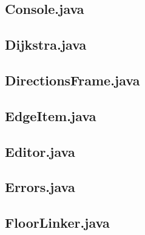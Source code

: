 \documentclass[12pt,letterpaper,titlepage]{article}   %
\begin{document}
\singlespacing
\begin{spacing}{0.7}
\tiny


\subsection{Console.java}
\begin{lgrind}

\end{lgrind}

\subsection{Dijkstra.java}
\begin{lgrind}

\end{lgrind}

\subsection{DirectionsFrame.java}
\begin{lgrind}

\end{lgrind}

\subsection{EdgeItem.java}
\begin{lgrind}

\end{lgrind}

\subsection{Editor.java}
\begin{lgrind}

\end{lgrind}

\subsection{Errors.java}
\begin{lgrind}

\end{lgrind}

\subsection{FloorLinker.java}
\begin{lgrind}

\end{lgrind}


\end{spacing}
\end{document}
